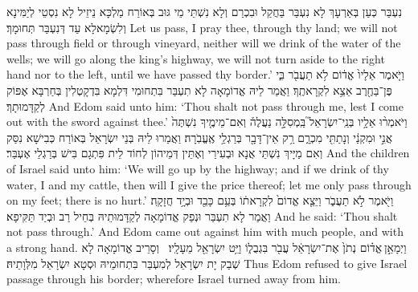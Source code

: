 {נִעְבַּר כְּעַן בְּאַרְעָךְ לָא נִעְבַּר בַּחֲקַל וּבִכְרַם וְלָא נִשְׁתֵּי מֵי גּוּב בְּאוֹרַח מַלְכָּא נֵיזֵיל לָא נִסְטֵי לְיַמִּינָא וְלִשְׂמָאלָא עַד דְּנִעְבַּר תְּחוּמָךְ׃}
{Let us pass, I pray thee, through thy land; we will not pass through field or through vineyard, neither will we drink of the water of the wells; we will go along the king’s highway, we will not turn aside to the right hand nor to the left, until we have passed thy border.’}{}
{וַיֹּ֤אמֶר אֵלָיו֙ אֱד֔וֹם לֹ֥א תַעֲבֹ֖ר בִּ֑י פֶּן־בַּחֶ֖רֶב אֵצֵ֥א לִקְרָאתֶֽךָ׃
}
{וַאֲמַר לֵיהּ אֱדוֹמָאָה לָא תִעְבַּר בִּתְחוּמִי דִּלְמָא בִּדְקָטְלִין בְּחַרְבָּא אֶפּוֹק לְקַדָּמוּתָךְ׃}
{And Edom said unto him: ‘Thou shalt not pass through me, lest I come out with the sword against thee.’}{}
{וַיֹּאמְר֨וּ אֵלָ֥יו בְּנֵֽי־יִשְׂרָאֵל֮ בַּֽמְסִלָּ֣ה נַעֲלֶה֒ וְאִם־מֵימֶ֤יךָ נִשְׁתֶּה֙ אֲנִ֣י וּמִקְנַ֔י וְנָתַתִּ֖י מִכְרָ֑ם רַ֥ק אֵין־דָּבָ֖ר בְּרַגְלַ֥י אֶֽעֱבֹֽרָה׃
}
{וַאֲמַרוּ לֵיהּ בְּנֵי יִשְׂרָאֵל בְּאוֹרַח כְּבִישָׁא נִסַּק וְאִם מַיָּיךְ נִשְׁתֵּי אֲנָא וּבְעִירַי וְאֶתֵּין דְּמֵיהוֹן לְחוֹד לֵית פִּתְגָם בִּישׁ בְּרַגְלַי אֶעְבַּר׃}
{And the children of Israel said unto him: ‘We will go up by the highway; and if we drink of thy water, I and my cattle, then will I give the price thereof; let me only pass through on my feet; there is no hurt.’}{}
{וַיֹּ֖אמֶר לֹ֣א תַעֲבֹ֑ר וַיֵּצֵ֤א אֱדוֹם֙ לִקְרָאת֔וֹ בְּעַ֥ם כָּבֵ֖ד וּבְיָ֥ד חֲזָקָֽה׃
}
{וַאֲמַר לָא תִעְבַּר וּנְפַק אֱדוֹמָאָה לְקַדָּמוּתֵיהּ בְּחֵיל רַב וּבְיַד תַּקִּיפָא׃}
{And he said: ‘Thou shalt not pass through.’ And Edom came out against him with much people, and with a strong hand.}{}
{וַיְמָאֵ֣ן \legarmeh  אֱד֗וֹם נְתֹן֙ אֶת־יִשְׂרָאֵ֔ל עֲבֹ֖ר בִּגְבֻל֑וֹ וַיֵּ֥ט יִשְׂרָאֵ֖ל מֵעָלָֽיו׃ \petucha }
{וְסָרֵיב אֱדוֹמָאָה לָא שְׁבַק יָת יִשְׂרָאֵל לְמִעְבַּר בִּתְחוּמֵיהּ וּסְטָא יִשְׂרָאֵל מִלְּוָתֵיהּ׃}
{Thus Edom refused to give Israel passage through his border; wherefore Israel turned away from him.}{}
